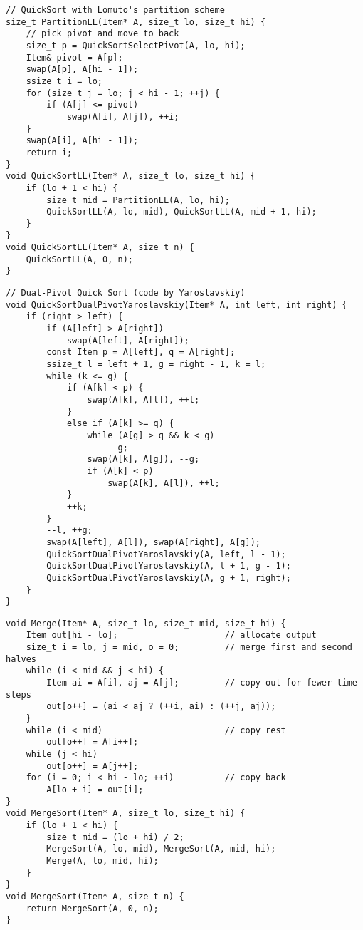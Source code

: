 \documentclass[a4paper,landscape,12pt,twoside,english]{scrartcl}
\begin{document}
\clearpage
\fontsize{19}{21}\selectfont
\begin{verbatim}
// QuickSort with Lomuto's partition scheme
size_t PartitionLL(Item* A, size_t lo, size_t hi) {
    // pick pivot and move to back
    size_t p = QuickSortSelectPivot(A, lo, hi);
    Item& pivot = A[p];
    swap(A[p], A[hi - 1]);
    ssize_t i = lo;
    for (size_t j = lo; j < hi - 1; ++j) {
        if (A[j] <= pivot)
            swap(A[i], A[j]), ++i;
    }
    swap(A[i], A[hi - 1]);
    return i;
}
void QuickSortLL(Item* A, size_t lo, size_t hi) {
    if (lo + 1 < hi) {
        size_t mid = PartitionLL(A, lo, hi);
        QuickSortLL(A, lo, mid), QuickSortLL(A, mid + 1, hi);
    }
}
void QuickSortLL(Item* A, size_t n) {
    QuickSortLL(A, 0, n);
}
\end{verbatim}

\clearpage
\fontsize{16}{18}\selectfont
\begin{verbatim}
// Dual-Pivot Quick Sort (code by Yaroslavskiy)
void QuickSortDualPivotYaroslavskiy(Item* A, int left, int right) {
    if (right > left) {
        if (A[left] > A[right])
            swap(A[left], A[right]);
        const Item p = A[left], q = A[right];
        ssize_t l = left + 1, g = right - 1, k = l;
        while (k <= g) {
            if (A[k] < p) {
                swap(A[k], A[l]), ++l;
            }
            else if (A[k] >= q) {
                while (A[g] > q && k < g)
                    --g;
                swap(A[k], A[g]), --g;
                if (A[k] < p)
                    swap(A[k], A[l]), ++l;
            }
            ++k;
        }
        --l, ++g;
        swap(A[left], A[l]), swap(A[right], A[g]);
        QuickSortDualPivotYaroslavskiy(A, left, l - 1);
        QuickSortDualPivotYaroslavskiy(A, l + 1, g - 1);
        QuickSortDualPivotYaroslavskiy(A, g + 1, right);
    }
}
\end{verbatim}

\clearpage
\fontsize{18}{20}\selectfont
\begin{verbatim}
void Merge(Item* A, size_t lo, size_t mid, size_t hi) {
    Item out[hi - lo];                     // allocate output
    size_t i = lo, j = mid, o = 0;         // merge first and second halves
    while (i < mid && j < hi) {
        Item ai = A[i], aj = A[j];         // copy out for fewer time steps
        out[o++] = (ai < aj ? (++i, ai) : (++j, aj));
    }
    while (i < mid)                        // copy rest
        out[o++] = A[i++];
    while (j < hi)
        out[o++] = A[j++];
    for (i = 0; i < hi - lo; ++i)          // copy back
        A[lo + i] = out[i];
}
void MergeSort(Item* A, size_t lo, size_t hi) {
    if (lo + 1 < hi) {
        size_t mid = (lo + hi) / 2;
        MergeSort(A, lo, mid), MergeSort(A, mid, hi);
        Merge(A, lo, mid, hi);
    }
}
void MergeSort(Item* A, size_t n) {
    return MergeSort(A, 0, n);
}
\end{verbatim}
\end{document}
